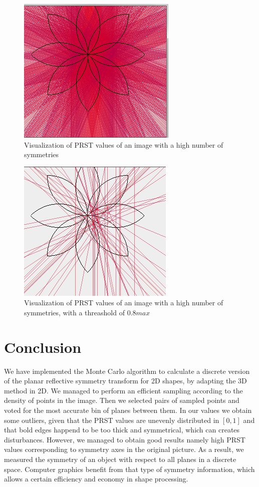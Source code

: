 \documentclass[10pt,a4paper]{article}			%
\begin{document}
\begin{figure}[h]
\centering
 \includegraphics[scale = 0.7]{img/rosace_5000.png}
 \caption{Visualization of PRST values of an image with a high number of symmetries}
 \label{rosace}
\end{figure}


\begin{figure}[h!]
\centering
 \includegraphics[scale = 0.7]{img/rosace_2000_seuil08.png}
 \caption{Visualization of PRST values of an image with a high number of symmetries, with a threashold of $0.8max$}
 \label{rosace 2}
\end{figure}

	\section*{Conclusion}
We have implemented the Monte Carlo algorithm to calculate a discrete version of the planar reflective symmetry transform for 2D shapes, by adapting the 3D method in 2D. We managed to perform an efficient sampling according to the density of points in the image. Then we selected pairs of sampled points and voted for the most accurate bin of planes between them. In our values we obtain some outliers, given that the PRST values are unevenly distributed in $[0,1]$ and that bold edges happend to be too thick and symmetrical, which can creates disturbances. However, we managed to obtain good results namely high PRST values corresponding to symmetry axes in the original picture. As a result, we measured the symmetry of an object with respect to all planes in a discrete space. Computer graphics benefit from that type of symmetry information, which allows a certain efficiency and economy in shape processing.

\nocite{*}


		
\end{document}
